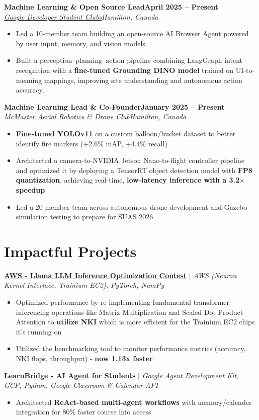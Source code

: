\documentclass[letterpaper,10pt]{article}
\newcommand{\entry}[4]{\textbf{#1}\hfill\textbf{\small #2}\\\textit{\small #3}\hfill\textit{\small #4}\par}
\begin{document}
\entry{Machine Learning \& Open Source Lead}{April 2025 -- Present}{\href{https://github.com/DSC-McMaster-U/interface-ai}{Google Developer Student Clubs}}{Hamilton, Canada}
\begin{itemize}\small
\item Led a 10-member team building an open-source AI Browser Agent powered by user input, memory, and vision models
\item Built a perception--planning--action pipeline combining LangGraph intent recognition with a \textbf{fine-tuned Grounding DINO model} trained on UI-to-meaning mappings, improving site understanding and autonomous action accuracy.
\end{itemize}\vspace{2pt}
\entry{Machine Learning Lead \& Co-Founder}{January 2025 -- Present}{\href{https://www.macdrones.ca/}{McMaster Aerial Robotics \& Drone Club}}{Hamilton, Canada}
\begin{itemize}\small
\item \textbf{Fine-tuned YOLOv11} on a custom balloon/bucket dataset to better identify fire markers (+2.6\% mAP, +4.4\% recall)
\item Architected a camera-to-NVIDIA Jetson Nano-to-flight controller pipeline and optimized it by deploying a TensorRT object detection model with \textbf{FP8 quantization}, achieving real-time, \textbf{low-latency inference with a 3.2\ensuremath{\times} speedup}
\item Led a 20-member team across autonomous drone development and Gazebo simulation testing to prepare for SUAS 2026
\end{itemize}\vspace{2pt}
\section{Impactful Projects}
{\small\textbf{\href{https://github.com/SachinVedGupta/nki-llama}{AWS - Llama LLM Inference Optimization Contest}} $|$ \emph{AWS (Neuron Kernel Interface, Trainium EC2), PyTorch, NumPy}}\par
\begin{itemize}\small
\item Optimized performance by re-implementing fundamental transformer inferencing operations like Matrix Multiplication and Scaled Dot Product Attention to \textbf{utilize NKI} which is more efficient for the Trainium EC2 chips it's running on
\item Utilized the benchmarking tool to monitor performance metrics (accuracy, NKI flops, throughput) - \textbf{now 1.13x faster}
\end{itemize}
{\small\textbf{\href{https://github.com/SachinVedGupta/LearnBridge}{LearnBridge - AI Agent for Students}} $|$ \emph{Google Agent Development Kit, GCP, Python, Google Classroom \& Calendar API}}\par
\begin{itemize}\small
\item Architected \textbf{ReAct-based multi-agent workflows} with memory/calender integration for 80\% faster course info access
\end{itemize}
\end{document}
